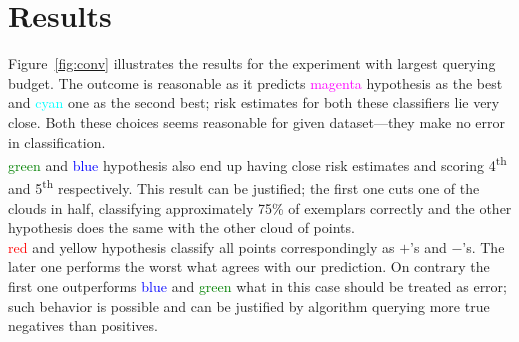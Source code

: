 \documentclass[12pt, a4paper, pdflatex, leqno]{report}
\newcommand{\ts}{\textsuperscript}
\begin{document}
\section{Results}
Figure~\ref{fig:conv} illustrates the results for the experiment with largest querying budget. The outcome is reasonable as it predicts \textcolor{magenta}{magenta} hypothesis as the best and \textcolor{cyan}{cyan} one as the second best; risk estimates for both these classifiers lie very close. Both these choices seems reasonable for given dataset---they make no error in classification.\\
\textcolor{green}{green} and \textcolor{blue}{blue} hypothesis also end up having close risk estimates and scoring 4\ts{th} and 5\ts{th} respectively. This result can be justified; the first one cuts one of the clouds in half, classifying approximately 75\% of exemplars correctly and the other hypothesis does the same with the other cloud of points.\\

\textcolor{red}{red} and \textcolor{Dandelion}{yellow} hypothesis classify all points correspondingly as $+$'s and $-$'s. The later one performs the worst what agrees with our prediction. On contrary the first one outperforms \textcolor{blue}{blue} and \textcolor{green}{green} what in this case should be treated as error; such behavior is possible and can be justified by algorithm querying more true negatives than positives.\\
\end{document}
